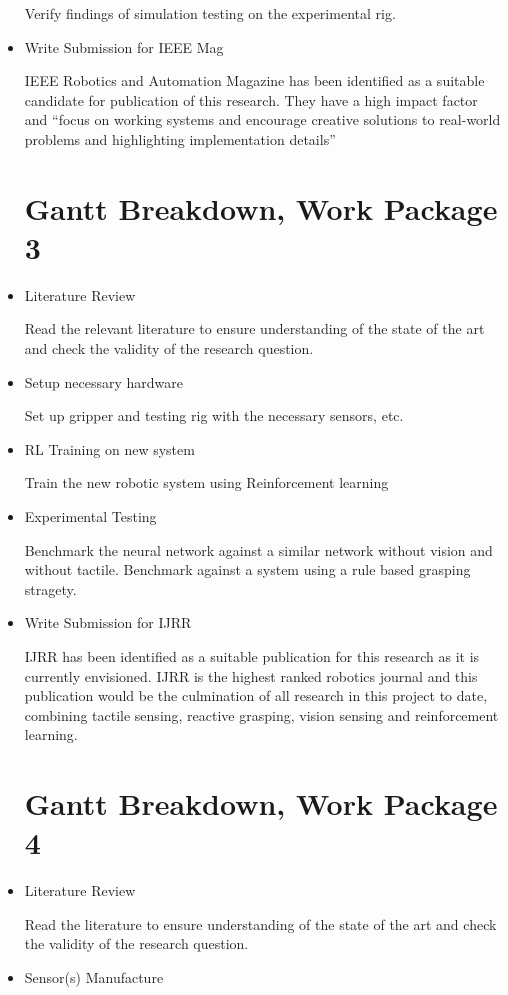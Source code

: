 \begin{itemize}
    Verify findings of simulation testing on the experimental rig.
    \item Write Submission for IEEE Mag
    
    IEEE Robotics and Automation Magazine has been identified as a suitable candidate for publication of this research. They have a high impact factor and “focus on working systems and encourage creative solutions to real-world problems and highlighting implementation details”

\newpage

\section{Gantt Breakdown, Work Package 3}\label{GanttBreakdownWP3}
    \item Literature Review
    
    Read the relevant literature to ensure understanding of the state of the art and check the validity of the research question.
    \item Setup necessary hardware
    
    Set up gripper and testing rig with the necessary sensors, etc.
    \item RL Training on new system
    
    Train the new robotic system using Reinforcement learning
    \item Experimental Testing
    
    Benchmark the neural network against a similar network without vision and without tactile. Benchmark against a system using a rule based grasping stragety.
    \item Write Submission for IJRR
    
    IJRR has been identified as a suitable publication for this research as it is currently envisioned. IJRR is the highest ranked robotics journal and this publication would be the culmination of all research in this project to date, combining tactile sensing, reactive grasping, vision sensing and reinforcement learning.
    
    \newpage
    
\section{Gantt Breakdown, Work Package 4}\label{GanttBreakdownWP4}
    \item Literature Review
    
    Read the literature to ensure understanding of the state of the art and check the validity of the research question.
    \item Sensor(s) Manufacture
    

\end{itemize}
